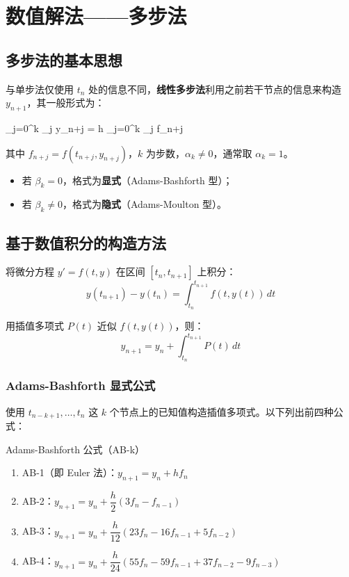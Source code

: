\chapter{数值解法——多步法}


\section{多步法的基本思想}

与单步法仅使用 $t_n$ 处的信息不同，\textbf{线性多步法}利用之前若干节点的信息来构造 $y_{n+1}$，其一般形式为：
\begin{myformula}
	\sum_{j=0}^{k} \alpha_j y_{n+j} = h \sum_{j=0}^{k} \beta_j f_{n+j}
\end{myformula}
其中 $f_{n+j} = f(t_{n+j}, y_{n+j})$，$k$ 为步数，$\alpha_k \neq 0$，通常取 $\alpha_k = 1$。

\begin{itemize}
	\item 若 $\beta_k = 0$，格式为\textbf{显式}（Adams-Bashforth 型）；
	\item 若 $\beta_k \neq 0$，格式为\textbf{隐式}（Adams-Moulton 型）。
\end{itemize}

\section{基于数值积分的构造方法}

将微分方程 $y' = f(t, y)$ 在区间 $[t_n, t_{n+1}]$ 上积分：
\[
y(t_{n+1}) - y(t_n) = \int_{t_n}^{t_{n+1}} f(t, y(t)) \, dt
\]

用插值多项式 $P(t)$ 近似 $f(t, y(t))$，则：
\[
y_{n+1} = y_n + \int_{t_n}^{t_{n+1}} P(t) \, dt
\]

\subsection{Adams-Bashforth 显式公式}

使用 $t_{n-k+1}, \ldots, t_n$ 这 $k$ 个节点上的已知值构造插值多项式。以下列出前四种公式：

\begin{myTheorem}{Adams-Bashforth 公式（AB-k）}
	\begin{enumerate}
		\item AB-1（即 Euler 法）：$y_{n+1} = y_n + h f_n$
		\item AB-2：$y_{n+1} = y_n + \dfrac{h}{2} (3 f_n - f_{n-1})$
		\item AB-3：$y_{n+1} = y_n + \dfrac{h}{12} (23 f_n - 16 f_{n-1} + 5 f_{n-2})$
		\item AB-4：$y_{n+1} = y_n + \dfrac{h}{24} (55 f_n - 59 f_{n-1} + 37 f_{n-2} - 9 f_{n-3})$
	\end{enumerate}
\end{myTheorem}

